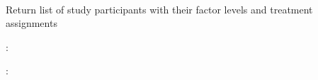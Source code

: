 \documentclass[letterpaper,10pt,english]{sphinxmanual}
\begin{document}
\begin{fulllineitems}
\label{\detokenize{api:get--study_participants}}~

\begin{fulllineitems}
\label{\detokenize{api:get--study_participants}}
Return list of study participants with their factor levels and treatment assignments

:

\begin{sphinxVerbatim}[commandchars=\\\{\}]
  
 
\end{sphinxVerbatim}

:

\begin{sphinxVerbatim}[commandchars=\\\{\}]
  
 
 


\end{sphinxVerbatim}
\end{fulllineitems}
\end{fulllineitems}
\end{document}
